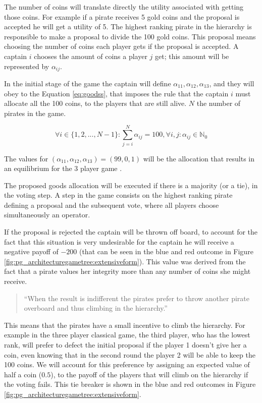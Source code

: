The number of coins will translate directly the utility associated with getting those coins. For example if a pirate receives 5 gold coins and the proposal is accepted he will get a utility of 5. The highest ranking pirate in the hierarchy is responsible to make a proposal to divide the 100 gold coins. This proposal means choosing the number of coins each player gets if the proposal is accepted. A captain $i$ chooses the amount of coins a player $j$ get; this amount will be represented by $\alpha_{ij}$.

In the initial stage of the game the captain will define $\alpha_{11}, \alpha_{12}, \alpha_{13}$, and they will obey to the Equation \ref{eq:goodss}, that imposes the rule that the captain $i$ must allocate all the 100 coins, to the players that are still alive. $N$ the number of pirates in the game. 

\begin{equation}
\label{eq:goodss}
\forall i \in \{1 , 2, ..., N-1\} : \sum_{j=i}^{N}\alpha_{ij}=100, \forall i,j :\alpha_{ij}\in\mathbb{N}_{0}
\end{equation}

The values for $(\alpha_{11}, \alpha_{12}, \alpha_{13})=(99, 0, 1)$ will be the allocation that results in an equilibrium for the $3$ player game .

The proposed goods allocation will be executed if there is a majority (or a tie), in the voting step. A step in the game consists on the highest ranking pirate defining a proposal and the subsequent vote, where all players choose simultaneously an operator. 

If the proposal is rejected the captain will be thrown off board, to account for the fact that this situation is very undesirable for the captain he will receive a negative payoff of $-200$ (that can be seen in the blue and red outcome in Figure \ref{fig:pg_architecturegametree:extensiveform}). This value was derived from the fact that a pirate values her integrity more than any number of coins she might receive.


\begin{quotation}
``When the result is indifferent the pirates prefer to throw another pirate overboard and thus climbing in the hierarchy.''
\end{quotation}

This means that the pirates have a small incentive to climb the hierarchy. For example in the three player classical game, the third player, who has the lowest rank, will prefer to defect the initial proposal if the player 1 doesn't give her a coin, even knowing that in the second round the player 2 will be able to keep the 100 coins. We will account for this preference by assigning an expected value of half a coin ($0.5$), to the payoff of the players that will climb on the hierarchy if the voting fails. This tie breaker is shown in the blue and red outcomes in Figure \ref{fig:pg_architecturegametree:extensiveform}.

